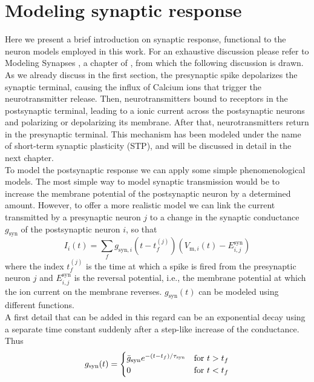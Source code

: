 \documentclass[a4paper, 12pt, twoside, openright]{book}
\begin{document}
\section{Modeling synaptic response}
Here we present a brief introduction on synaptic response, functional to the neuron models employed in this work. For an exhaustive discussion please refer to Modeling Synapses \cite{modeling_synapses}, a chapter of \cite{DeSchutter2009}, from which the following discussion is drawn.\\
As we already discuss in the first section, the presynaptic spike depolarizes the synaptic terminal, causing the influx of Calcium ions that trigger the neurotransmitter release. Then, neurotransmitters bound to receptors in the postsynaptic terminal, leading to a ionic current across the postsynaptic neurons and polarizing or depolarizing its membrane. After that, neurotransmitters return in the presynaptic terminal. This mechanism has been modeled under the name of short-term synaptic plasticity (STP), and will be discussed in detail in the next chapter.\\
To model the postsynaptic response we can apply some simple phenomenological models. The most simple way to model synaptic transmission would be to increase the membrane potential of the postsynaptic neuron by a determined amount. However, to offer a more realistic model we can link the current transmitted by a presynaptic neuron $j$ to a change in the synaptic conductance $g_{\text{syn}}$ of the postsynaptic neuron $i$, so that
\begin{equation}
\label{eq:cond}
    I_i (t) = \sum_f g_{\text{syn},i}(t - t^{(j)}_f) (V_{\text{m}, i}(t) - E^{\text{syn}}_{i,j}) 
\end{equation}
where the index $t^{(j)}_f$ is the time at which a spike is fired from the presynaptic neuron $j$ and $E^{\text{syn}}_{i,j}$ is the reversal potential, i.e., the membrane potential at which the ion current on the membrane reverses. $g_{\text{syn}}(t)$ can be modeled using different functions.\\
A first detail that can be added in this regard can be an exponential decay using a separate time constant suddenly after a step-like increase of the conductance. Thus
\begin{align}
\label{eq:cond_exp}
\centering
    g_{\text{syn}}(t) =
    \begin{cases}
        \bar{g}_{\text{syn}} e^{-(t-t_{f})/\tau_{\text{syn}}} & \text{for } t>t_{f}\\
        0 & \text{for } t<t_{f}
    \end{cases}
\end{align}
\end{document}
